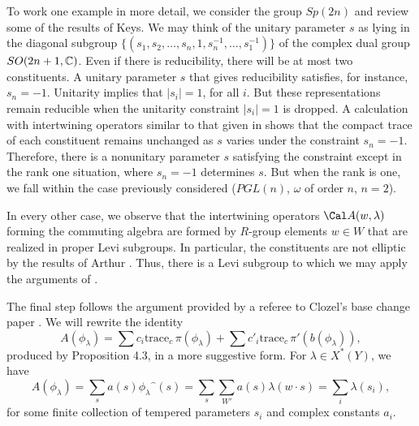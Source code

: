 To work one example in more detail, we consider the group $Sp(2n)$
and review some of the results of Keys.
We may
think of the unitary parameter $s$ as lying in the diagonal subgroup
$\{(s_1,s_2,\dots,s_n,1,s_n^{-1},\dots,s_1^{-1})\}$ of
the complex dual group $SO(2n+1,{\Bbb C})$. 
Even if there is reducibility, there will be at most
two constituents.
A unitary
parameter $s$ that gives reducibility satisfies, for instance, $s_n=-1$.
Unitarity implies that
$|s_i|=1$, for all $i$.  But these representations remain
reducible when the unitarity constraint $|s_i| = 1$ is dropped.
A calculation with intertwining operators similar to that
given in \cite{H1,2} shows that the compact trace of each constituent remains 
unchanged as $s$ varies under the constraint $s_n=-1$.
Therefore, there is a nonunitary parameter
$s$ satisfying the constraint except in the rank one situation, where
$s_n=-1$ determines $s$. 
But when the rank is one,
we fall within the case previously considered ($PGL(n)$, $\omega$
of order $n$,
$n=2$).

In every other case, we observe that the intertwining
operators ${\Cal A}(w,\lambda)$ forming the commuting algebra are
formed by $R$-group elements $w\in W$
that are realized in proper Levi subgroups. In particular,
the constituents
are not elliptic by the results of Arthur \cite{A2}.  
Thus, there is a Levi subgroup
to which we may apply the arguments of \cite{H1,2}.

The final step follows the argument provided by a referee to Clozel's
base change paper \cite{Cl2,p.257}.  
We will rewrite the
identity
$$A(\phi_\lambda) = \sum c_i \text{trace}_c\,\pi(\phi_\lambda)
    + \sum c'_i \text{trace}_c \,\pi'(b(\phi_\lambda)),$$
produced
    by Proposition 4.3, in a more suggestive form.
For $\lambda\in X^*(Y)$, we have
$$A(\phi_\lambda) = \sum_s a(s) \phi_\lambda\hat{\phantom o}(s)
 = \sum_s \sum_{W'} a(s) \lambda(w\cdot s) 
 = \sum_i \lambda(s_i),$$ for some finite collection
of tempered parameters $s_i$ and complex constants $a_i$.


